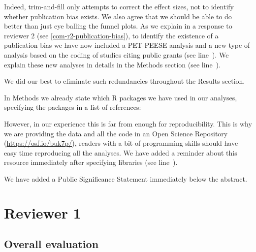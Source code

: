 Indeed, trim-and-fill only attempts to correct the effect sizes, not to identify whether publication bias exists. We also agree that we should be able to do better than just eye balling the funnel plots. As we explain in a response to reviewer 2 (see \ref{com-r2-publication-bias}), to identify the existence of a publication bias we have now included a PET-PEESE analysis and a new type of analysis based on the coding of studies citing public grants (see line~). We explain these new analyses in details in the Methods section (see line~). 



We did our best to eliminate such redundancies throughout the Results section.



In Methods we already state which R packages we have used in our analyses, specifying the packages in a list of references:


However, in our experience this is far from enough for reproducibility. This is why we are providing the data and all the code in an Open Science Repository (\url{https://osf.io/buk7p/}), readers with a bit of programming skills should have easy time reproducing all the analyses. We have added a reminder about this resource immediately after specifying libraries (see line~). 



We have added a Public Significance Statement immediately below the abstract. 



\section{Reviewer 1}
\label{rev:r1}

\subsection{Overall evaluation}
\label{rev:r1sum}

